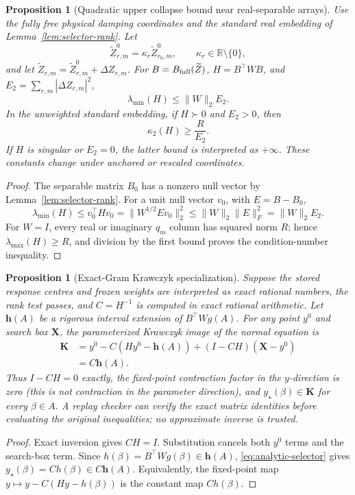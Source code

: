 \documentclass[11pt]{article}
\newtheorem{proposition}[theorem]{Proposition}
\theoremstyle{definition}
\theoremstyle{remark}
\newcommand{\R}{\mathbb R}
\begin{document}
\begin{proposition}[Quadratic upper collapse bound near real-separable arrays]
\label{prop:gram-collapse}
Use the fully free physical damping coordinates and the standard real
embedding of Lemma~\ref{lem:selector-rank}.  Let
\[
 \widetilde Z^0_{r,m}=\kappa_r\widetilde Z^0_{r_0,m},
 \qquad \kappa_r\in\R\setminus\{0\},
\]
and let \(\widetilde Z_{r,m}=\widetilde Z^0_{r,m}+\Delta Z_{r,m}\).
For \(B=B_{\rm full}(\widetilde Z)\), \(H=B^\top WB\), and
\(E_2=\sum_{r,m}|\Delta Z_{r,m}|^2\),
\[
 \lambda_{\min}(H)\le\lVert W\rVert_2 E_2.
\]
In the unweighted standard embedding, if \(H\succ0\) and \(E_2>0\), then
\[
 \kappa_2(H)\ge\frac{R}{E_2}.
\]
If \(H\) is singular or \(E_2=0\), the latter bound is interpreted as
\(+\infty\).  These constants change under anchored or rescaled coordinates.
\end{proposition}
\begin{proof}
The separable matrix \(B_0\) has a nonzero null vector by
Lemma~\ref{lem:selector-rank}.  For a unit null vector \(v_0\), with
\(E=B-B_0\),
\[
 \lambda_{\min}(H)\le v_0^\top Hv_0
 =\lVert W^{1/2}Ev_0\rVert_2^2
 \le\lVert W\rVert_2\lVert E\rVert_F^2
 =\lVert W\rVert_2E_2.
\]
For \(W=I\), every real or imaginary \(q_m\) column has squared norm \(R\);
hence \(\lambda_{\max}(H)\ge R\), and division by the first bound proves the
condition-number inequality.
\end{proof}

\begin{proposition}[Exact-Gram Krawczyk specialization]
\label{prop:exact-gram-krawczyk}
Suppose the stored response centres and frozen weights are interpreted as exact
rational numbers, the rank test passes, and \(C=H^{-1}\) is computed in exact
rational arithmetic.  Let \(\boldsymbol h(A)\) be a rigorous interval
extension of \(B^\top Wg(A)\).  For any point \(y^0\) and search box
\(\boldsymbol X\), the parameterized Krawczyk image of the normal equation is
\begin{align*}
 \boldsymbol K
 &=y^0-C(Hy^0-\boldsymbol h(A))
   +(I-CH)(\boldsymbol X-y^0)\\
 &=C\boldsymbol h(A).
\end{align*}
Thus \(I-CH=0\) exactly, the fixed-point contraction factor in the
\(y\)-direction is zero (this is not contraction in the parameter direction),
and
\(y_\star(\beta)\in\boldsymbol K\) for every \(\beta\in A\).  A replay checker
can verify the exact matrix identities before evaluating the original
inequalities; no approximate inverse is trusted.
\end{proposition}
\begin{proof}
Exact inversion gives \(CH=I\).  Substitution cancels both \(y^0\) terms and
the search-box term.  Since \(h(\beta)=B^\top Wg(\beta)\in\boldsymbol h(A)\),
\eqref{eq:analytic-selector} gives
\(y_\star(\beta)=Ch(\beta)\in C\boldsymbol h(A)\).  Equivalently, the
fixed-point map \(y\mapsto y-C(Hy-h(\beta))\) is the constant map
\(Ch(\beta)\).
\end{proof}
\end{document}
